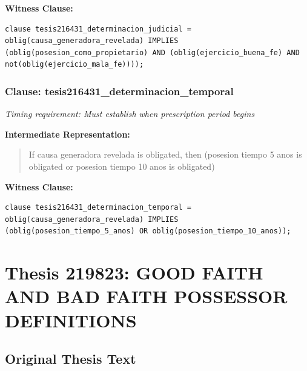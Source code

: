 \documentclass[11pt,a4paper]{article}
\begin{document}
\textbf{Witness Clause:}

\begin{lstlisting}[style=witnessstyle, language=Witness]
clause tesis216431_determinacion_judicial = oblig(causa_generadora_revelada) IMPLIES (oblig(posesion_como_propietario) AND (oblig(ejercicio_buena_fe) AND not(oblig(ejercicio_mala_fe))));
\end{lstlisting}

\subsubsection{Clause: tesis216431\_determinacion\_temporal}

\textit{Timing requirement: Must establish when prescription period begins}

\textbf{Intermediate Representation:}

\begin{quote}
If causa generadora revelada is obligated, then (posesion tiempo 5 anos is obligated or posesion tiempo 10 anos is obligated)
\end{quote}

\textbf{Witness Clause:}

\begin{lstlisting}[style=witnessstyle, language=Witness]
clause tesis216431_determinacion_temporal = oblig(causa_generadora_revelada) IMPLIES (oblig(posesion_tiempo_5_anos) OR oblig(posesion_tiempo_10_anos));
\end{lstlisting}

\newpage

\section{Thesis 219823: GOOD FAITH AND BAD FAITH POSSESSOR DEFINITIONS}
\label{thesis:219823}

\subsection{Original Thesis Text}
\end{document}
